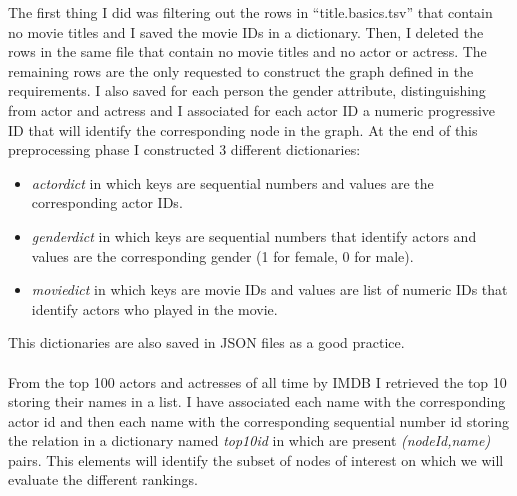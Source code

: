 \documentclass{article}
\begin{document}
The first thing I did was filtering out the rows in ``title.basics.tsv'' that contain no movie titles and I saved the movie IDs in a dictionary. Then, I deleted the rows in the same file that contain no movie titles and no actor or actress. The remaining rows are the only requested to construct the graph defined in the requirements. I also saved for each person the gender attribute, distinguishing from actor and actress and I associated for each actor ID a numeric progressive ID that will identify the corresponding node in the graph. At the end of this preprocessing phase I constructed 3 different dictionaries:
\begin{itemize}
    \item \textit{actordict} in which keys are sequential numbers and values are the corresponding actor IDs.
    \item \textit{genderdict} in which keys are sequential numbers that identify actors and values are the corresponding gender (1 for female, 0 for male).
    \item \textit{moviedict} in which keys are movie IDs and values are list of numeric IDs that identify actors who played in the movie.
\end{itemize}
This dictionaries are also saved in JSON files as a good practice.\\\\
From the top 100 actors and actresses of all time by IMDB I retrieved the top 10 storing their names in a list. I have associated each name with the corresponding actor id and then each name with the corresponding sequential number id storing the relation in a dictionary named \textit{top10id} in which are present \textit{(nodeId,name)} pairs. This elements will identify the subset of nodes of interest on which we will evaluate the different rankings.
\end{document}
